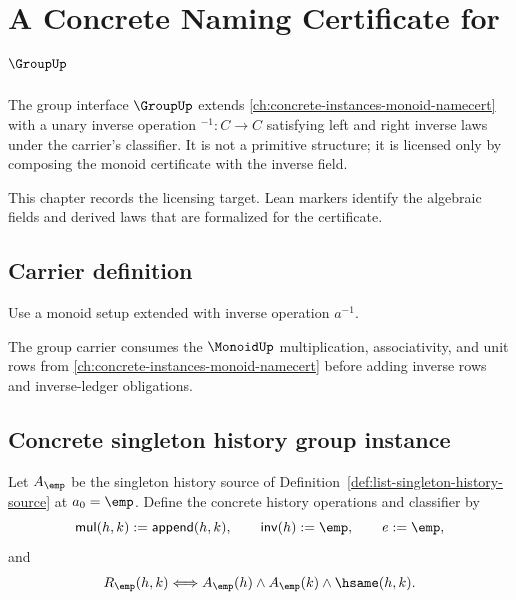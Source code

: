 \chapter{A Concrete Naming Certificate for \(\GroupUp\)}
\label{ch:concrete-instances-group-namecert}

The group interface \(\GroupUp\) extends \autoref{ch:concrete-instances-monoid-namecert} with a unary inverse operation \({}^{-1} : C \to C\) satisfying left and right inverse laws under the carrier's classifier. It is not a primitive structure; it is licensed only by composing the monoid certificate with the inverse field.

\begin{remark}
\label{rem:concrete-instances-group-namecert-roadmap}
This chapter records the licensing target. Lean markers identify the
algebraic fields and derived laws that are formalized for the certificate.
\end{remark}

\section{Carrier definition}

\begin{definition}
\label{def:group-carrier}
Use a monoid setup extended with inverse operation \(a^{-1}\).
\end{definition}

The group carrier consumes the $\MonoidUp$ multiplication, associativity, and
unit rows from \autoref{ch:concrete-instances-monoid-namecert} before adding
inverse rows and inverse-ledger obligations.

\section{Concrete singleton history group instance}
\label{sec:group-concrete-singleton-history-instance}

\begin{definition}
\label{def:concrete-singleton-history-group-instance}
Let $A_{\emp}$ be the singleton history source of
Definition~\ref{def:list-singleton-history-source} at $a_0=\emp$. Define
the concrete history operations and classifier by
$$
\mathsf{mul}(h,k):=\mathsf{append}(h,k),\qquad
\mathsf{inv}(h):=\emp,\qquad
e:=\emp,
$$
and
$$
R_{\emp}(h,k)\Longleftrightarrow
A_{\emp}(h)\land A_{\emp}(k)\land \hsame(h,k).
$$
\end{definition}

